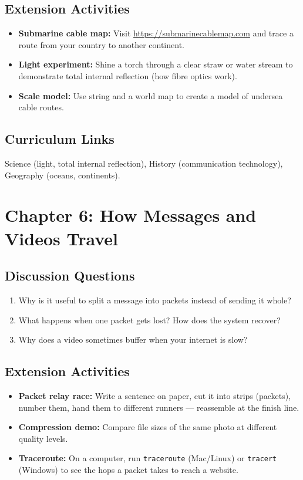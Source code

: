 \subsection*{Extension Activities}
\begin{itemize}
  \item \textbf{Submarine cable map:} Visit \url{https://submarinecablemap.com} and trace a route from your country to another continent.
  \item \textbf{Light experiment:} Shine a torch through a clear straw or water stream to demonstrate total internal reflection (how fibre optics work).
  \item \textbf{Scale model:} Use string and a world map to create a model of undersea cable routes.
\end{itemize}

\subsection*{Curriculum Links}
Science (light, total internal reflection), History (communication technology), Geography (oceans, continents).

\sectionrule

\section*{Chapter 6: How Messages and Videos Travel}

\subsection*{Discussion Questions}
\begin{enumerate}
  \item Why is it useful to split a message into packets instead of sending it whole?
  \item What happens when one packet gets lost? How does the system recover?
  \item Why does a video sometimes buffer when your internet is slow?
\end{enumerate}

\subsection*{Extension Activities}
\begin{itemize}
  \item \textbf{Packet relay race:} Write a sentence on paper, cut it into strips (packets), number them, hand them to different runners — reassemble at the finish line.
  \item \textbf{Compression demo:} Compare file sizes of the same photo at different quality levels.
  \item \textbf{Traceroute:} On a computer, run \texttt{traceroute} (Mac/Linux) or \texttt{tracert} (Windows) to see the hops a packet takes to reach a website.
\end{itemize}

